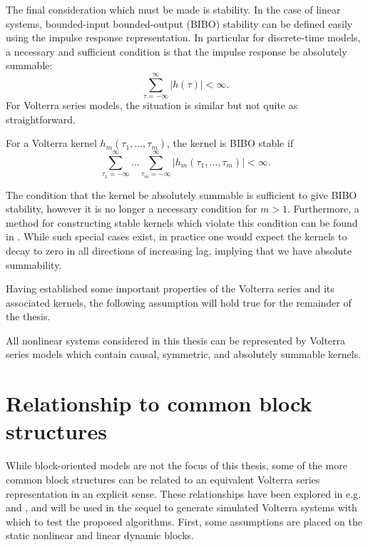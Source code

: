 The final consideration which must be made is stability. In the case of linear systems, bounded-input bounded-output (BIBO) stability can be defined easily using the impulse response representation. In particular for discrete-time models, a necessary and sufficient condition is that the impulse response be absolutely summable:
\begin{equation}
\sum_{\tau=-\infty}^{\infty} |h(\tau)| < \infty.
\end{equation}
For Volterra series models, the situation is similar but not quite as straightforward. 
\begin{property}
For a Volterra kernel $h_m(\tau_1, \hdots, \tau_m)$, the kernel is BIBO stable if
\begin{equation}
\sum_{\tau_1=-\infty}^{\infty} \hdots \sum_{\tau_m=-\infty}^{\infty}|h_m(\tau_1, \hdots, \tau_m)| < \infty.
\end{equation}
\end{property}
The condition that the kernel be absolutely summable is sufficient to give BIBO stability, however it is no longer a necessary condition for $m>1$. Furthermore, a method for constructing stable kernels which violate this condition can be found in \cite{Schetzen1980}. While such special cases exist, in practice one would expect the kernels to decay to zero in all directions of increasing lag, implying that we have absolute summability.

Having established some important properties of the Volterra series and its associated kernels, the following assumption will hold true for the remainder of the thesis.
\begin{assum}
All nonlinear systems considered in this thesis can be represented by Volterra series models which contain causal, symmetric, and absolutely summable kernels.
\end{assum}

\section{Relationship to common block structures}
\label{sec:BlockStructureRelationship}

While block-oriented models are not the focus of this thesis, some of the more common block structures can be related to an equivalent Volterra series representation in an explicit sense. These relationships have been explored in e.g. \cite{Westwick2003} and \cite{Kibangou2010}, and will be used in the sequel to generate simulated Volterra systems with which to test the proposed algorithms. First, some assumptions are placed on the static nonlinear and linear dynamic blocks.

